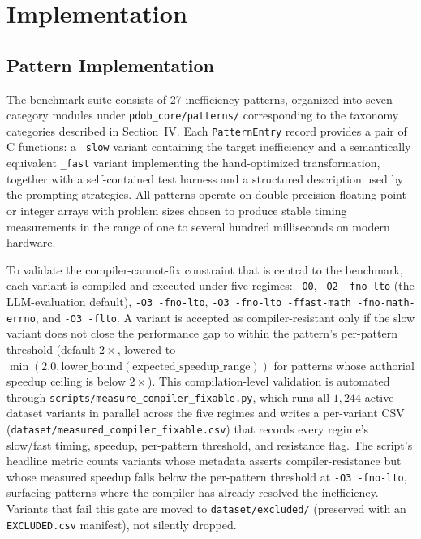 \section{Implementation}

\subsection{Pattern Implementation}

The benchmark suite consists of 27 inefficiency patterns, organized into seven category modules under \texttt{pdob\_core/patterns/} corresponding to the taxonomy categories described in Section~IV. Each \texttt{PatternEntry} record provides a pair of C functions: a \texttt{\_slow} variant containing the target inefficiency and a semantically equivalent \texttt{\_fast} variant implementing the hand-optimized transformation, together with a self-contained test harness and a structured description used by the prompting strategies. All patterns operate on double-precision floating-point or integer arrays with problem sizes chosen to produce stable timing measurements in the range of one to several hundred milliseconds on modern hardware.

To validate the compiler-cannot-fix constraint that is central to the benchmark, each variant is compiled and executed under five regimes: \texttt{-O0}, \texttt{-O2 -fno-lto} (the LLM-evaluation default), \texttt{-O3 -fno-lto}, \texttt{-O3 -fno-lto -ffast-math -fno-math-errno}, and \texttt{-O3 -flto}. A variant is accepted as compiler-resistant only if the slow variant does not close the performance gap to within the pattern's per-pattern threshold (default $2\times$, lowered to $\min(2.0, \text{lower\_bound}(\text{expected\_speedup\_range}))$ for patterns whose authorial speedup ceiling is below $2\times$). This compilation-level validation is automated through \texttt{scripts/measure\_compiler\_fixable.py}, which runs all $1{,}244$ active dataset variants in parallel across the five regimes and writes a per-variant CSV (\texttt{dataset/measured\_compiler\_fixable.csv}) that records every regime's slow/fast timing, speedup, per-pattern threshold, and resistance flag. The script's headline metric counts variants whose metadata asserts compiler-resistance but whose measured speedup falls below the per-pattern threshold at \texttt{-O3 -fno-lto}, surfacing patterns where the compiler has already resolved the inefficiency. Variants that fail this gate are moved to \texttt{dataset/excluded/} (preserved with an \texttt{EXCLUDED.csv} manifest), not silently dropped.

